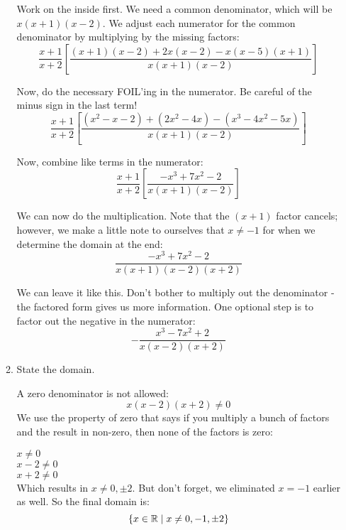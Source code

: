 \documentclass[letterpaper,12pt,fleqn]{article}
\begin{document}
\begin{enumerate}
\begin{enumerate}
    Work on the inside first. We need a common denominator, which will be
    $x(x+1)(x-2)$. We adjust each numerator for the common denominator by
    multiplying by the missing factors:
    \[\frac{x+1}{x+2}\left[\frac{(x+1)(x-2)+2x(x-2)-x(x-5)(x+1)}{x(x+1)(x-2)}
      \right]\]

    Now, do the necessary FOIL'ing in the numerator. Be careful of the minus
    sign in the last term!
    \[\frac{x+1}{x+2}\left[\frac{(x^2-x-2)+(2x^2-4x)-(x^3-4x^2-5x)}{x(x+1)(x-2)}
      \right]\]

    Now, combine like terms in the numerator:
    \[\frac{x+1}{x+2}\left[\frac{-x^3+7x^2-2}{x(x+1)(x-2)}\right]\]

    We can now do the multiplication. Note that the $(x+1)$ factor cancels;
    however, we make a little note to ourselves that $x\ne-1$ for when we
    determine the domain at the end:
    \[\frac{-x^3+7x^2-2}{x(x+1)(x-2)(x+2)}\]

    We can leave it like this. Don't bother to multiply out the denominator -
    the factored form gives us more information. One optional step is to
    factor out the negative in the numerator:
    \[-\frac{x^3-7x^2+2}{x(x-2)(x+2)}\]
    
  \item State the domain.

    A zero denominator is not allowed:
    \[x(x-2)(x+2)\ne0\]
    We use the property of zero that says if you multiply a bunch of factors
    and the result in non-zero, then none of the factors is zero:

    $x\ne0$ \\
    $x-2\ne0$ \\
    $x+2\ne0$ \\

    Which results in $x\ne0,\pm2$. But don't forget, we eliminated $x=-1$
    earlier as well. So the final domain is:
    \[\{x\in\mathbb{R}\mid x\ne0,-1,\pm2\}\]
  \end{enumerate}
\end{enumerate}
  
\end{document}
